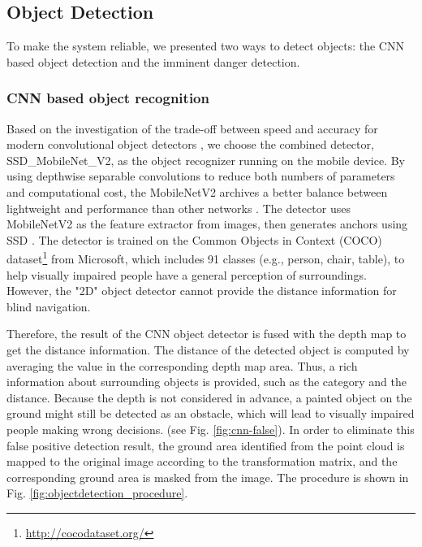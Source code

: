 \documentclass{ieeeaccess}
\begin{document}
\subsection{Object Detection}
To make the system reliable, we presented two ways to detect objects:  the CNN based object detection and the imminent danger detection. 


\subsubsection{CNN based object recognition}

Based on the investigation of the trade-off between speed and accuracy for modern convolutional object detectors \cite{IEEEexample:huang2017speed}, we choose the combined detector, SSD\_MobileNet\_V2, as the object recognizer running on the mobile device.
By using depthwise separable convolutions to reduce both numbers of parameters and computational cost, the MobileNet\-V2
\cite{IEEEexample:sandler2018mobilenetv2} archives a better balance between lightweight and performance than other networks \cite{IEEEexample:ren2015faster} \cite{IEEEexample:liu2016ssd} \cite{IEEEexample:howard2017mobilenets} \cite{IEEEexample:zhang2018shufflenet}. The detector uses MobileNet\-V2 as the feature extractor from images, then generates anchors using SSD \cite{IEEEexample:liu2016ssd}. The detector is trained on the Common Objects in Context (COCO) dataset\footnote{\url{http://cocodataset.org/}} from Microsoft, which includes 91 classes (e.g., person, chair, table), to help visually impaired people have a general perception of surroundings. However, the "2D" object detector cannot provide the distance information for blind navigation. 



Therefore, the result of the CNN object detector is fused with the depth map to get the distance information. The distance of the detected object is computed by averaging the value in the corresponding depth map area. Thus, a rich information about surrounding objects is provided, such as the category and the distance. Because the depth is not considered in advance, a painted object on the ground might still be detected as an obstacle, which will lead to visually impaired people making wrong decisions. (see Fig. \ref{fig:cnn-false}). In order to eliminate this false positive detection result, the ground area identified from the point cloud is mapped to the original image according to the transformation matrix, and the corresponding ground area is masked from the image. The procedure is shown in Fig. \ref{fig:objectdetection_procedure}.
\end{document}
